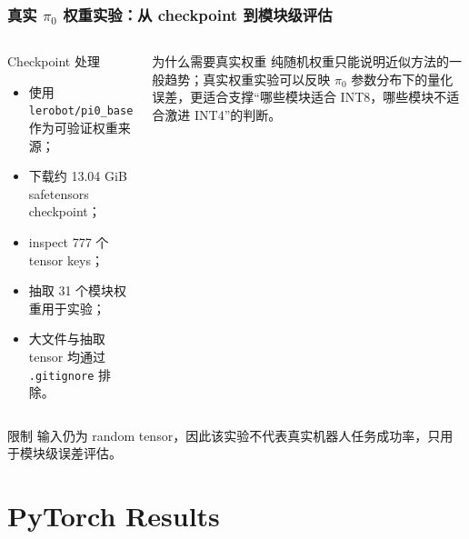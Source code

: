 \documentclass[10pt, aspectratio=169]{beamer}
\newcommand{\piZero}{\texorpdfstring{$\pi_0$}{pi0}\xspace}
\begin{document}
\begin{frame}
  \frametitle{真实 \piZero 权重实验：从 checkpoint 到模块级评估}
  \small
  \begin{columns}[T,onlytextwidth]
    \begin{block}{Checkpoint 处理}
      \scriptsize
      \begin{itemize}
        \item 使用 \texttt{lerobot/pi0\_base} 作为可验证权重来源；
        \item 下载约 13.04 GiB safetensors checkpoint；
        \item inspect 777 个 tensor keys；
        \item 抽取 31 个模块权重用于实验；
        \item 大文件与抽取 tensor 均通过 \texttt{.gitignore} 排除。
      \end{itemize}
    \end{block}

    \begin{alertblock}{为什么需要真实权重}
      \scriptsize
      纯随机权重只能说明近似方法的一般趋势；真实权重实验可以反映 \piZero 参数分布下的量化误差，更适合支撑“哪些模块适合 INT8，哪些模块不适合激进 INT4”的判断。
    \end{alertblock}
  \end{columns}

  \vspace{4pt}
  \begin{exampleblock}{限制}
    输入仍为 random tensor，因此该实验不代表真实机器人任务成功率，只用于模块级误差评估。
  \end{exampleblock}
\end{frame}

\section{PyTorch Results}
\end{document}
